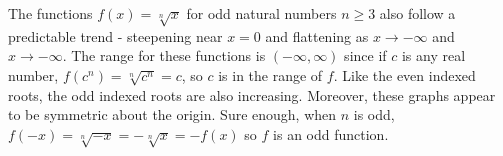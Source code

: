 \documentclass{ximera}
\begin{document}

The functions $f(x) = \sqrt[n]{x}$ for odd natural numbers $n \geq 3$ also follow a predictable trend - steepening near $x = 0$ and flattening as $x \rightarrow -\infty$ and $x \rightarrow -\infty$.  The range for these functions is $(-\infty, \infty)$ since if $c$ is any real number, $f(c^n) = \sqrt[n]{c^n} = c$, so $c$ is in the range of $f$.  Like the even indexed roots, the odd indexed roots are also increasing.  Moreover, these graphs appear to be symmetric about the origin.  Sure enough, when $n$ is odd,  $f(-x) = \sqrt[n]{-x} = -\sqrt[n]{x} = -f(x)$ so $f$ is an odd function.












\end{document}
